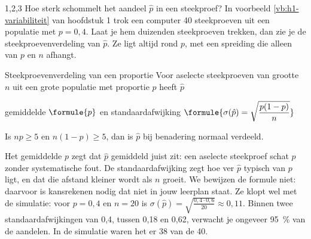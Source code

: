 \begin{alleenvoor}{1,2,3}
Hoe sterk schommelt het aandeel $\hat{p}$ in een steekproef? In voorbeeld \ref{vb:h1-variabiliteit} van hoofdstuk 1 trok een computer 40 steekproeven uit een populatie met $p = 0{,}4$. Laat je hem duizenden steekproeven trekken, dan zie je de steekproevenverdeling van $\hat{p}$. Ze ligt altijd rond $p$, met een spreiding die alleen van $p$ en $n$ afhangt.

\begin{theorie}
\begin{stelling}{Steekproevenverdeling van een proportie}
Voor aselecte steekproeven van grootte $n$ uit een grote populatie met proportie $p$ heeft $\hat{p}$

\vspace{1mm}
\qquad gemiddelde $\formule{p}$ \qquad en standaardafwijking \qquad $\formule{\sigma(\hat{p}) = \sqrt{\dfrac{p(1 - p)}{n}}}$

\vspace{1mm}
Is $np \geqslant 5$ en $n(1 - p) \geqslant 5$, dan is $\hat{p}$ bij benadering normaal verdeeld.
\end{stelling}
\end{theorie}

Het gemiddelde $p$ zegt dat $\hat{p}$ gemiddeld juist zit: een aselecte steekproef schat $p$ zonder systematische fout. De standaardafwijking zegt hoe ver $\hat{p}$ typisch van $p$ ligt, en dat die afstand kleiner wordt als $n$ groeit. We bewijzen de formule niet: daarvoor is kansrekenen nodig dat niet in jouw leerplan staat. Ze klopt wel met de simulatie: voor $p = 0{,}4$ en $n = 20$ is $\sigma(\hat{p}) = \sqrt{\frac{0{,}4 \cdot 0{,}6}{20}} \approx 0{,}11$. Binnen twee standaardafwijkingen van 0,4, tussen 0,18 en 0,62, verwacht je ongeveer 95~\% van de aandelen. In de simulatie waren het er 38 van de 40.
\end{alleenvoor}
